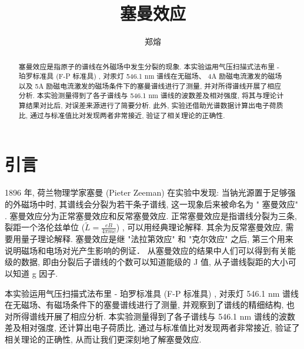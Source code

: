 \documentclass[font=default]{mpltx}
\makeatletter
\newcommand{\note}[1]{{\color{gray}#1}}
\newcommand*\file[1]{\textbf{\texttt{#1}}}
\newcommand\releasedate{%
    \href{https://github.com/CastleStar14654/PKUMpLtX/releases/tag/\mpltx@fileversion}%
        {\mpltx@filedate, \mpltx@fileversion}}
\makeatother
\begin{document}
\title{塞曼效应} %
\author{郑熔} %
\date{}
\begin{abstract}
  塞曼效应是指原子的谱线在外磁场中发生分裂的现象. 
  本实验运用气压扫描式法布里 - 珀罗标准具 (F-P 标准具) , 
  对汞灯 546.1 nm 谱线在无磁场、 4A 励磁电流激发的磁场以及 5A 励磁电流激发的磁场条件下的塞曼谱线进行了测量, 
  并对所得谱线开展了相应分析.
  本实验测量得到了各子谱线与 546.1 nm 谱线的波数差及相对强度,
  将其与理论计算结果对比后,
  对误差来源进行了简要分析.
  此外, 实验还借助光谱数据计算出电子荷质比, 通过与标准值比对发现两者非常接近, 验证了相关理论的正确性.
\end{abstract}

\maketitle

\section{引言}
  1896 年, 荷兰物理学家塞曼 (Pieter Zeeman) 在实验中发现: 
  当钠光源置于足够强的外磁场中时, 其谱线会分裂为若干条子谱线, 
  这一现象后来被命名为  " 塞曼效应" . 塞曼效应分为正常塞曼效应和反常塞曼效应.
  正常塞曼效应是指谱线分裂为三条, 
  裂距一个洛伦兹单位 ($\tilde{L} = \frac{eB}{4\pi mc}$) , 可以用经典理论解释.
  其余为反常塞曼效应, 需要用量子理论解释.
  塞曼效应是继 "法拉第效应" 和 "克尔效应" 之后, 第三个用来说明磁场和电场对光产生影响的例证．
  从塞曼效应的结果中人们可以得到有关能级的数据, 即由分裂后子谱线的个数可以知道能级的 J 值, 从子谱线裂距的大小可以知道 g 因子.
  \par
  本实验运用气压扫描式法布里 - 珀罗标准具 (F-P 标准具) , 
  对汞灯 546.1 nm 谱线在无磁场、有磁场条件下的塞曼谱线进行了测量, 
  并观察到了谱线的精细结构, 也对所得谱线开展了相应分析.
  本实验测量得到了各子谱线与 546.1 nm 谱线的波数差及相对强度,
  还计算出电子荷质比, 通过与标准值比对发现两者非常接近, 验证了相关理论的正确性, 从而让我们更深刻地了解塞曼效应.
\end{document}
